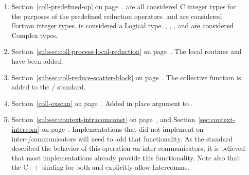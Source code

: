\begin{enumerate}
\item
{}%
%
Section~\ref{coll-predefined-op} on page~\pageref{coll-predefined-op}. %
\newline
{} are all considered C integer types for the purposes of the predefined reduction operators.  and  are considered Fortran integer types.  is considered a Logical type. , , , and  are considered Complex types.

\item
Section~\ref{subsec:coll-process-local-reduction} on page~\pageref{subsec:coll-process-local-reduction}. %
\newline
The local routines  and  have been added. 

\item
Section~\ref{subsec:coll-reduce-scatter-block} on page~\pageref{subsec:coll-reduce-scatter-block}. %
\newline
The collective function  is added to the \MPI/ standard.

\item
Section~\ref{coll-exscan} on page~\pageref{coll-exscan}. %
\newline
Added in place argument to .

\item
Section~\ref{subsec:context-intracomconst} on page~\pageref{subsec:context-intracomconst}, and %
Section~\ref{sec:context-intercom} on page~\pageref{sec:context-intercom}. %
\newline
Implementations that did not implement  on inter\hyphen/communicators will need to add that functionality. As the standard described the behavior of this operation on inter-communicators, it is believed that most implementations already provide this functionality. Note also that the C++ binding for both  and  explicitly allow Intercomms.


\end{enumerate}

